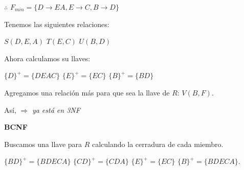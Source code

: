 \documentclass[12pt, letterpaper]{article}
\begin{document}
\begin{itemize}
\begin{itemize}
\begin{itemize}
                                                      $\therefore$ $F_{min}=\{D \rightarrow EA, E \rightarrow C, B\rightarrow D\}$\vspace{.3cm}

                                                      Tenemos las siguientes relaciones:\vspace{.1cm}

                                                      $S(D,E,A)$ \hspace{.5cm} $T(E,C)$ \hspace{.5cm} $U(B,D)$ \vspace{.3cm}

                                                      Ahora calculamos su llaves:\vspace{.1cm}

                                                      $\{D\}^+=\{DEAC\}$ \hspace{.5cm} $\{E\}^+=\{EC\}$ \hspace{.5cm} $\{B\}^+=\{BD\}$\vspace{.3cm}

                                                      Agregamos una relación más para que sea la llave de $R$: $V(B,F)$. \vspace{.3cm}

                                                      Así,  $\Rightarrow$ \textit{ya está en 3NF}\vspace{.3cm}

                                                        \newpage
                                                      \textbf{BCNF} \vspace{.2cm}

                                                      Buscamos una llave para $R$ calculando la cerradura de cada miembro.\vspace{.1cm}

                                                      $\{BD\}^+=\{BDECA\}$ \hspace{.5cm} $\{CD\}^+=\{CDA\}$ \hspace{.5cm} $\{E\}^+=\{EC\}$ \hspace{.5cm} $\{B\}^+=\{BDECA\}$.\vspace{.3cm}


\end{itemize}
\end{itemize}
\end{itemize}
\end{document}
